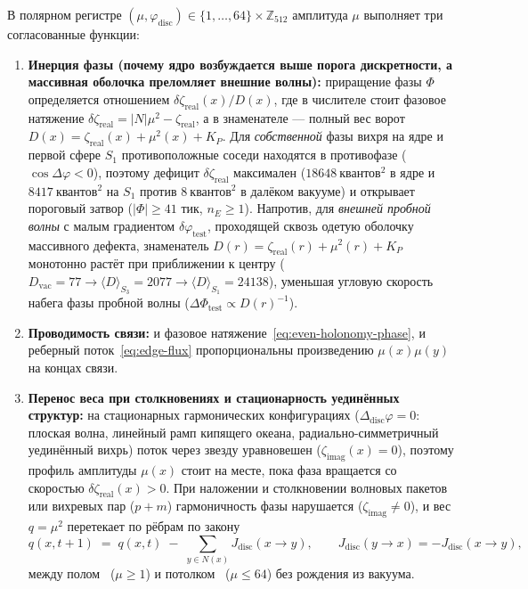 \begin{corollary}
\label{cor:what-mu-does}
В полярном регистре $(\mu,\varphi_{\mathrm{disc}})\in\{1,\dots,64\}\times\mathbb{Z}_{512}$ амплитуда $\mu$
выполняет три согласованные функции:
\begin{enumerate}[label=(\arabic*)]
\item \textbf{Инерция фазы (почему ядро возбуждается выше порога дискретности, а массивная оболочка преломляет внешние волны):}
  приращение фазы $\Phi$ определяется отношением $\delta\zeta_{\mathrm{real}}(x)/D(x)$, где
  в числителе стоит фазовое натяжение $\delta\zeta_{\mathrm{real}}=|N|\mu^2-\zeta_{\mathrm{real}}$,
  а в знаменателе --- полный вес ворот $D(x)=\zeta_{\mathrm{real}}(x)+\mu^2(x)+K_P$.
  Для \emph{собственной} фазы вихря на ядре и первой сфере $S_1$ противоположные соседи находятся
  в противофазе ($\cos\Delta\varphi<0$), поэтому дефицит $\delta\zeta_{\mathrm{real}}$ максимален
  ($18648\ \text{квантов}^2$ в ядре и $8417\ \text{квантов}^2$ на $S_1$ против $8\ \text{квантов}^2$ в далёком вакууме)
  и открывает пороговый затвор ($|\Phi|\ge 41$ тик, $n_E\ge 1$).
  Напротив, для \emph{внешней пробной волны} с малым градиентом $\delta\varphi_{\mathrm{test}}$,
  проходящей сквозь одетую оболочку массивного дефекта, знаменатель $D(r)=\zeta_{\mathrm{real}}(r)+\mu^2(r)+K_P$
  монотонно растёт при приближении к центру ($D_{\mathrm{vac}}=77 \to \langle D\rangle_{S_3}=2077 \to \langle D\rangle_{S_1}=24138$),
  уменьшая угловую скорость набега фазы пробной волны ($\Delta\Phi_{\mathrm{test}}\propto D(r)^{-1}$).
\item \textbf{Проводимость связи:} и фазовое натяжение~\eqref{eq:even-holonomy-phase},
  и реберный поток~\eqref{eq:edge-flux} пропорциональны произведению $\mu(x)\mu(y)$ на концах связи.
\item \textbf{Перенос веса при столкновениях и стационарность уединённых структур:}
  на стационарных гармонических конфигурациях ($\Delta_{\mathrm{disc}}\varphi=0$: плоская волна,
  линейный рамп кипящего океана, радиально-симметричный уединённый вихрь)
  поток через звезду уравновешен ($\zeta_{\mathrm{imag}}(x)=0$), поэтому профиль амплитуды $\mu(x)$
  стоит на месте, пока фаза вращается со скоростью $\delta\zeta_{\mathrm{real}}(x)>0$.
  При наложении и столкновении волновых пакетов или вихревых пар ($p+m$) гармоничность фазы
  нарушается ($\zeta_{\mathrm{imag}}\ne 0$), и вес $q=\mu^2$ перетекает по рёбрам по закону
  \begin{equation}
  \label{eq:discrete-mu-step}
    q(x,t+1) \;=\; q(x,t) \;-\; \sum_{y\in N(x)} J_{\mathrm{disc}}(x\to y),
    \qquad
    J_{\mathrm{disc}}(y\to x) = -J_{\mathrm{disc}}(x\to y),
  \end{equation}
  между полом~ ($\mu\ge 1$) и потолком~ ($\mu\le 64$) без рождения из вакуума.
\end{enumerate}
\end{corollary}

